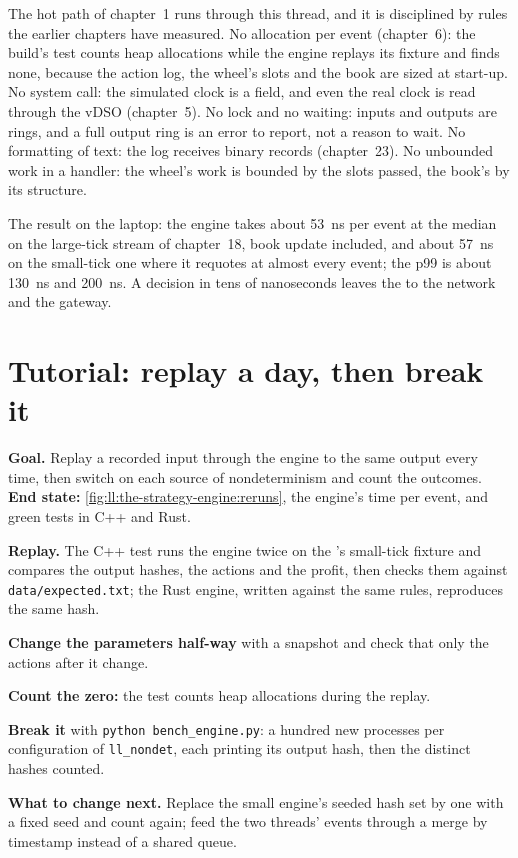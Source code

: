 The hot path of chapter~1 runs through this thread, and it is disciplined by rules the earlier chapters have measured. No
allocation per event (chapter~6): the build's test counts heap allocations while the engine replays its fixture and finds none,
because the action log, the wheel's slots and the book are sized at start-up. No system call: the simulated clock is a field,
and even the real clock is read through the vDSO (chapter~5). No lock and no waiting: inputs and outputs are rings, and a full
output ring is an error to report, not a reason to wait. No formatting of text: the log receives binary records (chapter~23). No
unbounded work in a handler: the wheel's work is bounded by the slots passed, the book's by its structure.

The result on the laptop: the engine takes about \qty{53}{\nano\second} per event at the median on the large-tick stream of
chapter~18, book update included, and about \qty{57}{\nano\second} on the small-tick one where it requotes at almost every
event; the p99 is about \qty{130}{\nano\second} and \qty{200}{\nano\second}. A decision in tens of nanoseconds leaves the
 to the network and the gateway.

\section{Tutorial: replay a day, then break it}\label{tut:ll:the-strategy-engine:tut}

\begin{tutorial}
\textbf{Goal.} Replay a recorded input through the engine to the same output every time, then switch on each source of
nondeterminism and count the outcomes. \textbf{End state:} \cref{fig:ll:the-strategy-engine:reruns}, the engine's time per
event, and green tests in C++ and Rust.
\begin{tutsteps}
\item \textbf{Replay.} The C++ test runs the engine twice on the 's small-tick fixture and compares the output
hashes, the actions and the profit, then checks them against \texttt{data/expected.txt}; the Rust engine, written against the
same rules, reproduces the same hash.
\item \textbf{Change the parameters half-way} with a snapshot and check that only the actions after it change.
\item \textbf{Count the zero:} the test counts heap allocations during the replay.
\item \textbf{Break it} with \texttt{python bench\_engine.py}: a hundred new processes per configuration of \texttt{ll\_nondet},
each printing its output hash, then the distinct hashes counted.
\end{tutsteps}
\textbf{What to change next.} Replace the small engine's seeded hash set by one with a fixed seed and count again; feed the two
threads' events through a merge by timestamp instead of a shared queue.
\end{tutorial}

